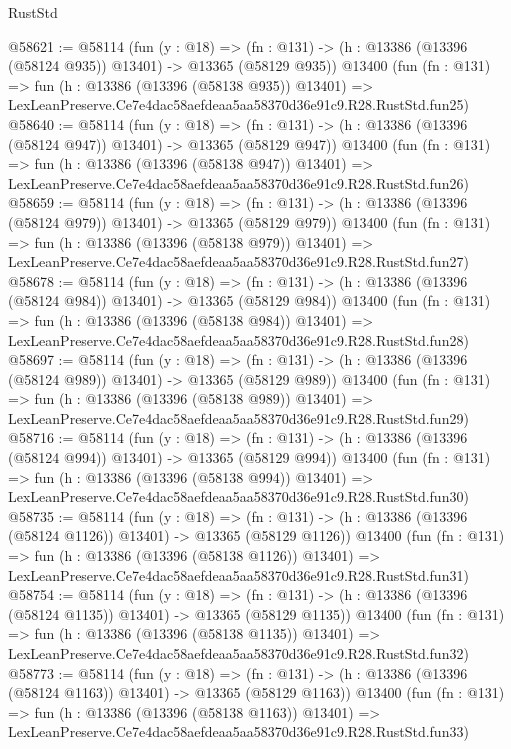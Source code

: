 \begin{lexlean}{RustStd}
\begin{coremodule}
@58621 := @58114
    (fun (y : @18) =>
    (fn : @131) -> (h : @13386 (@13396 (@58124 @935)) @13401) -> @13365 (@58129 @935))
    @13400
    (fun (fn : @131) =>
    fun (h : @13386 (@13396 (@58138 @935)) @13401) =>
    LexLeanPreserve.Ce7e4dac58aefdeaa5aa58370d36e91c9.R28.RustStd.fun25)
@58640 := @58114
    (fun (y : @18) =>
    (fn : @131) -> (h : @13386 (@13396 (@58124 @947)) @13401) -> @13365 (@58129 @947))
    @13400
    (fun (fn : @131) =>
    fun (h : @13386 (@13396 (@58138 @947)) @13401) =>
    LexLeanPreserve.Ce7e4dac58aefdeaa5aa58370d36e91c9.R28.RustStd.fun26)
@58659 := @58114
    (fun (y : @18) =>
    (fn : @131) -> (h : @13386 (@13396 (@58124 @979)) @13401) -> @13365 (@58129 @979))
    @13400
    (fun (fn : @131) =>
    fun (h : @13386 (@13396 (@58138 @979)) @13401) =>
    LexLeanPreserve.Ce7e4dac58aefdeaa5aa58370d36e91c9.R28.RustStd.fun27)
@58678 := @58114
    (fun (y : @18) =>
    (fn : @131) -> (h : @13386 (@13396 (@58124 @984)) @13401) -> @13365 (@58129 @984))
    @13400
    (fun (fn : @131) =>
    fun (h : @13386 (@13396 (@58138 @984)) @13401) =>
    LexLeanPreserve.Ce7e4dac58aefdeaa5aa58370d36e91c9.R28.RustStd.fun28)
@58697 := @58114
    (fun (y : @18) =>
    (fn : @131) -> (h : @13386 (@13396 (@58124 @989)) @13401) -> @13365 (@58129 @989))
    @13400
    (fun (fn : @131) =>
    fun (h : @13386 (@13396 (@58138 @989)) @13401) =>
    LexLeanPreserve.Ce7e4dac58aefdeaa5aa58370d36e91c9.R28.RustStd.fun29)
@58716 := @58114
    (fun (y : @18) =>
    (fn : @131) -> (h : @13386 (@13396 (@58124 @994)) @13401) -> @13365 (@58129 @994))
    @13400
    (fun (fn : @131) =>
    fun (h : @13386 (@13396 (@58138 @994)) @13401) =>
    LexLeanPreserve.Ce7e4dac58aefdeaa5aa58370d36e91c9.R28.RustStd.fun30)
@58735 := @58114
    (fun (y : @18) =>
    (fn : @131) -> (h : @13386 (@13396 (@58124 @1126)) @13401) -> @13365 (@58129 @1126))
    @13400
    (fun (fn : @131) =>
    fun (h : @13386 (@13396 (@58138 @1126)) @13401) =>
    LexLeanPreserve.Ce7e4dac58aefdeaa5aa58370d36e91c9.R28.RustStd.fun31)
@58754 := @58114
    (fun (y : @18) =>
    (fn : @131) -> (h : @13386 (@13396 (@58124 @1135)) @13401) -> @13365 (@58129 @1135))
    @13400
    (fun (fn : @131) =>
    fun (h : @13386 (@13396 (@58138 @1135)) @13401) =>
    LexLeanPreserve.Ce7e4dac58aefdeaa5aa58370d36e91c9.R28.RustStd.fun32)
@58773 := @58114
    (fun (y : @18) =>
    (fn : @131) -> (h : @13386 (@13396 (@58124 @1163)) @13401) -> @13365 (@58129 @1163))
    @13400
    (fun (fn : @131) =>
    fun (h : @13386 (@13396 (@58138 @1163)) @13401) =>
    LexLeanPreserve.Ce7e4dac58aefdeaa5aa58370d36e91c9.R28.RustStd.fun33)

\end{coremodule}
\end{lexlean}
